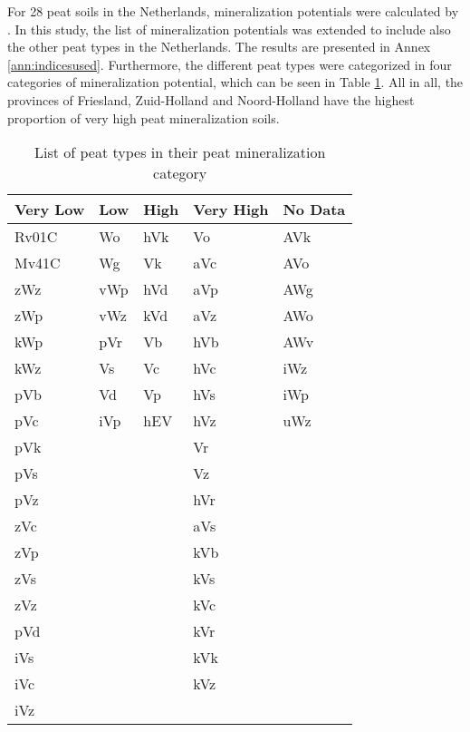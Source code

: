 \documentclass[a4paper,12pt]{scrbook}
\begin{document}
For 28 peat soils in the Netherlands, mineralization potentials were calculated by \citep{stouthamer2008toelichting}.  In this study,  the list of mineralization potentials was extended to include also the other peat types in the Netherlands. The results are presented in Annex \ref{ann:indicesused}. Furthermore, the different peat types were categorized in four categories of mineralization potential, which can be seen in Table \ref{tab:minpotcategories}. 
All in all, the provinces of Friesland, Zuid-Holland and Noord-Holland have the highest proportion of very high peat mineralization soils.

\begin{table}[htbp]
\caption{List of peat types in their peat mineralization category}
\begin{center}
\begin{tabular}{|p{3cm}|p{3cm}|p{3cm}|p{3cm}|p{3cm}|}
\hline
Very Low & Low & High & Very High & No Data \\ \hline
Rv01C & Wo & hVk & Vo & AVk \\ \hline
Mv41C & Wg & Vk & aVc & AVo \\ \hline
zWz & vWp & hVd & aVp & AWg \\ \hline
zWp & vWz & kVd & aVz & AWo \\ \hline
kWp & pVr & Vb & hVb & AWv \\ \hline
kWz & Vs & Vc & hVc & iWz \\ \hline
pVb & Vd & Vp & hVs & iWp \\ \hline
pVc & iVp & hEV & hVz & uWz \\ \hline
pVk &  &  & Vr &  \\ \hline
pVs &  &  & Vz &  \\ \hline
pVz &  &  & hVr &  \\ \hline
zVc &  &  & aVs &  \\ \hline
zVp &  &  & kVb &  \\ \hline
zVs &  &  & kVs &  \\ \hline
zVz &  &  & kVc &  \\ \hline
pVd &  &  & kVr &  \\ \hline
iVs &  &  & kVk &  \\ \hline
iVc &  &  & kVz &  \\ \hline
iVz &  &  &  &  \\ \hline
\end{tabular}
\end{center}
\label{tab:minpotcategories}
\end{table}
\end{document}
